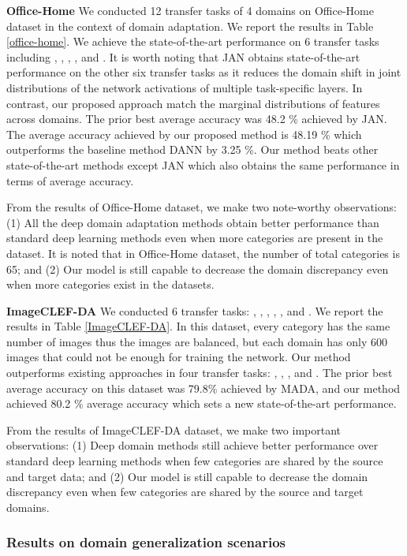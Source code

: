 \documentclass[review]{elsarticle}
\begin{document}
\textbf{Office-Home} We conducted 12 transfer tasks of 4 domains on Office-Home dataset in the context of domain adaptation. We report the results in  Table \ref{office-home}. We achieve the state-of-the-art performance on 6 transfer tasks including , , , ,  and . It is worth noting that JAN obtains state-of-the-art performance on the other six transfer tasks as it reduces the domain shift in joint distributions of the network activations of multiple task-specific layers. In contrast, our proposed approach match the marginal distributions of features across domains. The prior best average accuracy was 48.2 \% achieved by JAN. The average accuracy achieved by our proposed method is 48.19 \% which outperforms the baseline method DANN by 3.25 \%. Our method beats other state-of-the-art methods except JAN which also obtains the same performance in terms of average accuracy. 

From the results of Office-Home dataset, we make two note-worthy observations: (1) All the deep domain adaptation methods obtain better performance than standard deep learning methods even when more categories are present in the dataset. It is noted that in Office-Home dataset, the number of total categories is 65; and (2) Our model is still capable to decrease the domain discrepancy even when more categories exist in the datasets.




\textbf{ImageCLEF-DA} We conducted 6 transfer tasks: , , , , , and . We report the results in Table \ref{ImageCLEF-DA}. In this dataset, every category has the same number of images thus the images are balanced, but each domain has only 600 images that could not be enough for training the network. Our method outperforms existing approaches in four transfer tasks: , , , and . The prior best average accuracy on this dataset was 79.8\% achieved by MADA, and our method achieved 80.2 \% average accuracy which sets a new state-of-the-art performance.

From the results of ImageCLEF-DA dataset, we make two important observations: (1) Deep domain methods still achieve better performance over standard deep learning methods when few categories are shared by the source and target data; and (2) Our model is still capable to decrease the domain discrepancy even when few categories are shared by the source and target domains.

\subsubsection{Results on domain generalization scenarios}
\end{document}
